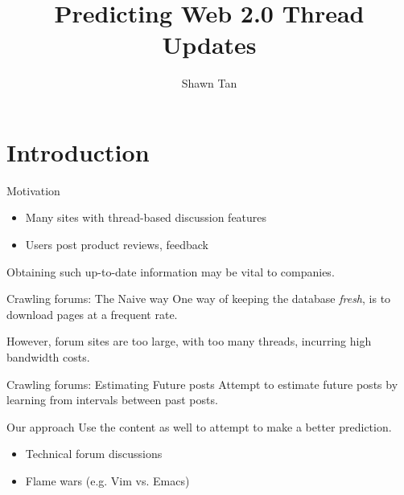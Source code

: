 \documentclass[compress]{beamer}
\title{Predicting Web 2.0 Thread Updates}
\author{Shawn Tan}
\date{}
\begin{document}
\maketitle
\section{Introduction}

\begin{frame}{Motivation}
	\begin{itemize}
		\item Many sites with thread-based discussion features
		\item Users post product reviews, feedback
	\end{itemize}
	Obtaining such up-to-date information may be vital to companies.
\end{frame}

\begin{frame}{Crawling forums: The Naive way}
	One way of keeping the database \emph{fresh}, is to download pages at a frequent rate.

	However, forum sites are too large, with too many threads, incurring high bandwidth costs.
\end{frame}
\begin{frame}{Crawling forums: Estimating Future posts}
	Attempt to estimate future posts by learning from intervals between past posts.
	
\end{frame}
\begin{frame}{Our approach}
	Use the content as well to attempt to make a better prediction.
	\begin{itemize}
		\item Technical forum discussions
		\item Flame wars (e.g. Vim vs. Emacs)
	\end{itemize}
\end{frame}
\end{document}
